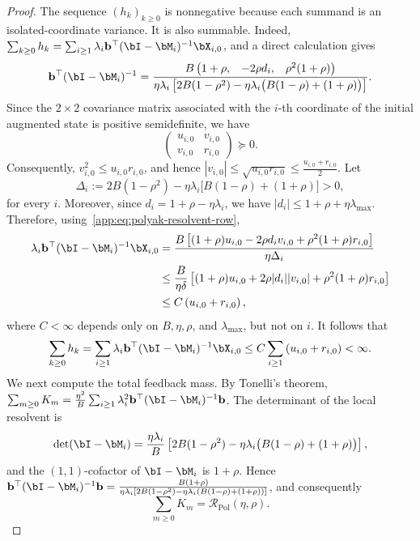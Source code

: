 \begin{proof}
The sequence \((h_k)_{k\geq0}\) is nonnegative because each summand is an isolated-coordinate variance. It is also summable. Indeed,
\(\sum_{k\geq0}h_k
=\sum_{i\geq1}\lambda_i\mathbf b^\top
(\bI-\bM_i)^{-1}\bX_{i,0}\), and a direct calculation gives
\begin{equation}
\label{app:eq:polyak-resolvent-row}
\mathbf b^\top(\bI-\bM_i)^{-1}
=
\frac{B
\begin{pmatrix}
1+\rho,&-2\rho d_i,&\rho^2(1+\rho)
\end{pmatrix}}
{\eta\lambda_i
\left[
2B(1-\rho^2)
-\eta\lambda_i\big(B(1-\rho)+(1+\rho)\big)
\right]}.
\end{equation}
Since the \(2\times2\) covariance matrix associated with the \(i\)-th coordinate of the initial augmented state is positive semidefinite, we have
\[
\begin{pmatrix}
u_{i,0} & v_{i,0}\\
v_{i,0} & r_{i,0}
\end{pmatrix}
\succeq0.
\]
Consequently, \(v_{i,0}^2\leq u_{i,0}r_{i,0}\), and hence
\(
|v_{i,0}|
\leq
\sqrt{u_{i,0}r_{i,0}}
\leq
\frac{u_{i,0}+r_{i,0}}{2}.
\)
Let
\[
\Delta_i
:=
2B(1-\rho^2)-\eta\lambda_i\big[B(1-\rho)+(1+\rho)\big]
>0,
\]
for every \(i\). Moreover, since \(d_i=1+\rho-\eta\lambda_i\), we have \(|d_i|\leq1+\rho+\eta\lambda_{\max}\). Therefore, using~\eqref{app:eq:polyak-resolvent-row},
\begin{align*}
\lambda_i\mathbf b^\top(\bI-\bM_i)^{-1}\bX_{i,0}
&=
\frac{B\left[(1+\rho)u_{i,0}-2\rho d_i v_{i,0}+\rho^2(1+\rho)r_{i,0}\right]}
{\eta\Delta_i}\\
&\leq
\frac{B}{\eta\delta}
\left[(1+\rho)u_{i,0}+2\rho|d_i||v_{i,0}|+\rho^2(1+\rho)r_{i,0}\right]\\
&\leq
C\left(u_{i,0}+r_{i,0}\right),
\end{align*}
where \(C<\infty\) depends only on \(B,\eta,\rho\), and \(\lambda_{\max}\), but not on \(i\). It follows that
\[
\sum_{k\geq0}h_k
=
\sum_{i\geq1}\lambda_i\mathbf b^\top(\bI-\bM_i)^{-1}\bX_{i,0}
\leq
C\sum_{i\geq1}\left(u_{i,0}+r_{i,0}\right)
<\infty.
\]
We next compute the total feedback mass. By Tonelli's theorem,
\(\sum_{m\geq0}K_m
=\frac{\eta^2}{B}\sum_{i\geq1}\lambda_i^2
\mathbf b^\top(\bI-\bM_i)^{-1}\mathbf b\).
The determinant of the local resolvent is
\[
\det(\bI-\bM_i)
=
\frac{\eta\lambda_i}{B}
\left[
2B(1-\rho^2)
-\eta\lambda_i\big(B(1-\rho)+(1+\rho)\big)
\right],
\]
and the \((1,1)\)-cofactor of \(\bI-\bM_i\) is \(1+\rho\). Hence
\(\mathbf b^\top(\bI-\bM_i)^{-1}\mathbf b
=\frac{B(1+\rho)}
{\eta\lambda_i[
2B(1-\rho^2)-\eta\lambda_i(B(1-\rho)+(1+\rho))]}\), and consequently
\[
\sum_{m\geq0}K_m
=
\mathcal R_{\mathrm{Pol}}(\eta,\rho).
\]


\end{proof}
